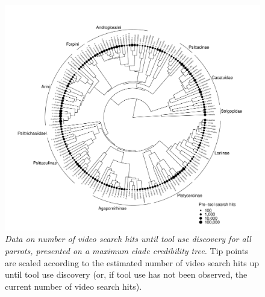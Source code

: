 \documentclass[
  man, donotrepeattitle,floatsintext]{apa6}
\begin{document}
\newpage



\begin{figure}
\centering
\includegraphics{manuscript_files/figure-latex/plotPhylo4-1.pdf}
\caption{\label{fig:plotPhylo4}\emph{Data on number of video search hits until tool use discovery for all parrots, presented on a maximum clade credibility tree.} Tip points are scaled according to the estimated number of video search hits up until tool use discovery (or, if tool use has not been observed, the current number of video search hits).}
\end{figure}

\newpage
\end{document}
